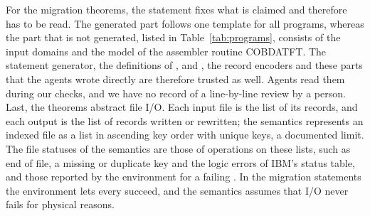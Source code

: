 For the migration theorems, the statement fixes what is claimed and therefore has to be read. The generated part
follows one template for all programs, whereas the part that is not generated, listed in Table~\ref{tab:programs},
consists of the input domains and the model of the assembler routine COBDATFT. The statement generator, the
definitions of ,  and , the record encoders and these parts that the agents wrote
directly are therefore trusted as well. Agents read them during our checks, and we have no record of a line-by-line
review by a person. Last, the theorems abstract file I/O. Each input file is the list of its records, and each output is
the list of records written or rewritten; the semantics represents an indexed file as a list in ascending key order
with unique keys, a documented limit. The file statuses of the semantics are those of operations on these lists, such as end
of file, a missing or duplicate key and the logic errors of IBM's status table, and those reported by the environment for a failing . In the migration statements the environment lets every  succeed, and the
semantics assumes that I/O never fails for physical reasons.


